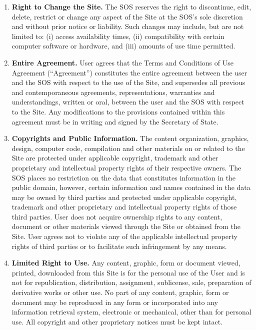 \begin{enumerate}
    \item \textbf{Right to Change the Site.} The SOS reserves the right to
    discontinue, edit, delete, restrict or change any aspect of the Site at the
    SOS's sole discretion and without prior notice or liability. Such changes
    may include, but are not limited to: (i) access availability times, (ii)
    compatibility with certain computer software or hardware, and (iii) amounts
    of use time permitted.

    \item \textbf{Entire Agreement.} User agrees that the Terms and Conditions
    of Use Agreement (``Agreement'') constitutes the entire agreement between
    the user and the SOS with respect to the use of the Site, and supersedes all
    previous and contemporaneous agreements, representations, warranties and
    understandings, written or oral, between the user and the SOS with respect
    to the Site. Any modifications to the provisions contained within this
    agreement must be in writing and signed by the Secretary of State.
    
    \item \textbf{Copyrights and Public Information.} The content organization,
    graphics, design, computer code, compilation and other materials on or
    related to the Site are protected under applicable copyright, trademark and
    other proprietary and intellectual property rights of their respective
    owners. The SOS places no restriction on the data that constitutes
    information in the public domain, however, certain information and names
    contained in the data may be owned by third parties and protected under
    applicable copyright, trademark and other proprietary and intellectual
    property rights of those third parties. User does not acquire ownership
    rights to any content, document or other materials viewed through the Site
    or obtained from the Site. User agrees not to violate any of the applicable
    intellectual property rights of third parties or to facilitate such
    infringement by any means.

    \item \textbf{Limited Right to Use.} Any content, graphic, form or document
    viewed, printed, downloaded from this Site is for the personal use of the
    User and is not for republication, distribution, assignment, sublicense,
    sale, preparation of derivative works or other use. No part of any content,
    graphic, form or document may be reproduced in any form or incorporated into
    any information retrieval system, electronic or mechanical, other than for
    personal use. All copyright and other proprietary notices must be kept
    intact.


\end{enumerate}
